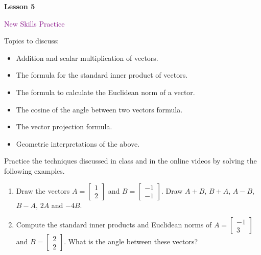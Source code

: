 \documentclass[10pt]{book}
\theoremstyle{definition}
\theoremstyle{remark}
\begin{document}
\begin{tcolorbox}[
  width=\textwidth,
  colback=gray!10, %
  colframe=white, %
  boxrule=0pt,    %
  left=1cm,       %
  right=1cm,      %
  sharp corners  %
]

\begin{minipage}[t]{0.5\textwidth}
  \Huge \textbf{Lesson 5}
\end{minipage}%
\hfill
\begin{minipage}[t]{0.5\textwidth}
  \Huge\textcolor{purple}{New Skills Practice}
\end{minipage}
\end{tcolorbox}

\begin{large}
\noindent
Topics to discuss:
\begin{itemize}
\item Addition and scalar multiplication of vectors. 
\item The formula for the standard inner product of vectors. 
\item The formula to calculate the Euclidean norm of a vector. 
\item The cosine of the angle between two vectors formula.
\item The vector projection formula. 
\item Geometric interpretations of the above.  
\end{itemize}
\newpage

\noindent
Practice the techniques discussed in class and in the online videos by solving the following examples. 
\begin{enumerate}
\item Draw the vectors $A = \begin{bmatrix} 1 \\ 2 \end{bmatrix}$ and $B = \begin{bmatrix}-1 \\ -1 \end{bmatrix}$. Draw $A + B$, $B + A$, $A - B$, $B - A$, $2A$ and $-4B$.
\vfil \vfil \vfil
\newpage

\item Compute the standard inner products and Euclidean norms of $A = \begin{bmatrix} -1 \\ 3 \end{bmatrix}$ and $B = \begin{bmatrix} 2 \\ 2 \end{bmatrix}$. What is the angle between these vectors?
\vfil \vfil \vfil


\end{enumerate}
\end{large}
\end{document}

